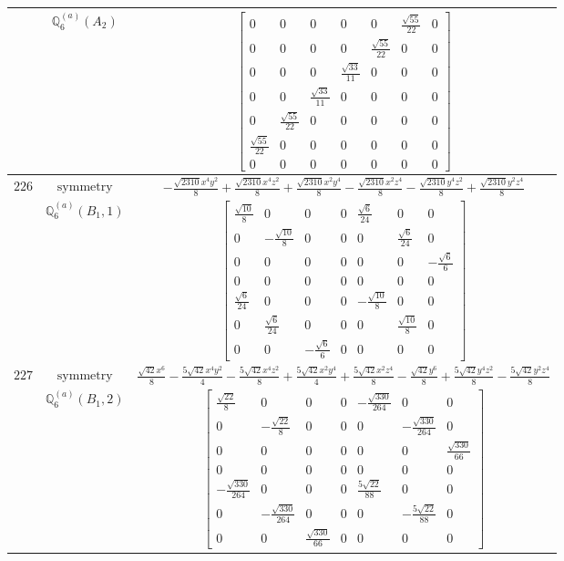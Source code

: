 \documentclass[fleqn,8pt,landscape]{jsarticle}
\begin{document}
\begin{longtable}{ccc}
$  $ & $ \mathbb{Q}_{6}^{(a)}(A_{2}) $ & $ \begin{bmatrix} 0 & 0 & 0 & 0 & 0 & \frac{\sqrt{55}}{22} & 0 \\ 0 & 0 & 0 & 0 & \frac{\sqrt{55}}{22} & 0 & 0 \\ 0 & 0 & 0 & \frac{\sqrt{33}}{11} & 0 & 0 & 0 \\ 0 & 0 & \frac{\sqrt{33}}{11} & 0 & 0 & 0 & 0 \\ 0 & \frac{\sqrt{55}}{22} & 0 & 0 & 0 & 0 & 0 \\ \frac{\sqrt{55}}{22} & 0 & 0 & 0 & 0 & 0 & 0 \\ 0 & 0 & 0 & 0 & 0 & 0 & 0 \end{bmatrix} $ \\ \hline
$ 226 $ & $ \text{symmetry} $ & $ - \frac{\sqrt{2310} x^{4} y^{2}}{8} + \frac{\sqrt{2310} x^{4} z^{2}}{8} + \frac{\sqrt{2310} x^{2} y^{4}}{8} - \frac{\sqrt{2310} x^{2} z^{4}}{8} - \frac{\sqrt{2310} y^{4} z^{2}}{8} + \frac{\sqrt{2310} y^{2} z^{4}}{8} $ \\
$  $ & $ \mathbb{Q}_{6}^{(a)}(B_{1},1) $ & $ \begin{bmatrix} \frac{\sqrt{10}}{8} & 0 & 0 & 0 & \frac{\sqrt{6}}{24} & 0 & 0 \\ 0 & - \frac{\sqrt{10}}{8} & 0 & 0 & 0 & \frac{\sqrt{6}}{24} & 0 \\ 0 & 0 & 0 & 0 & 0 & 0 & - \frac{\sqrt{6}}{6} \\ 0 & 0 & 0 & 0 & 0 & 0 & 0 \\ \frac{\sqrt{6}}{24} & 0 & 0 & 0 & - \frac{\sqrt{10}}{8} & 0 & 0 \\ 0 & \frac{\sqrt{6}}{24} & 0 & 0 & 0 & \frac{\sqrt{10}}{8} & 0 \\ 0 & 0 & - \frac{\sqrt{6}}{6} & 0 & 0 & 0 & 0 \end{bmatrix} $ \\ \hline
$ 227 $ & $ \text{symmetry} $ & $ \frac{\sqrt{42} x^{6}}{8} - \frac{5 \sqrt{42} x^{4} y^{2}}{4} - \frac{5 \sqrt{42} x^{4} z^{2}}{8} + \frac{5 \sqrt{42} x^{2} y^{4}}{4} + \frac{5 \sqrt{42} x^{2} z^{4}}{8} - \frac{\sqrt{42} y^{6}}{8} + \frac{5 \sqrt{42} y^{4} z^{2}}{8} - \frac{5 \sqrt{42} y^{2} z^{4}}{8} $ \\
$  $ & $ \mathbb{Q}_{6}^{(a)}(B_{1},2) $ & $ \begin{bmatrix} \frac{\sqrt{22}}{8} & 0 & 0 & 0 & - \frac{\sqrt{330}}{264} & 0 & 0 \\ 0 & - \frac{\sqrt{22}}{8} & 0 & 0 & 0 & - \frac{\sqrt{330}}{264} & 0 \\ 0 & 0 & 0 & 0 & 0 & 0 & \frac{\sqrt{330}}{66} \\ 0 & 0 & 0 & 0 & 0 & 0 & 0 \\ - \frac{\sqrt{330}}{264} & 0 & 0 & 0 & \frac{5 \sqrt{22}}{88} & 0 & 0 \\ 0 & - \frac{\sqrt{330}}{264} & 0 & 0 & 0 & - \frac{5 \sqrt{22}}{88} & 0 \\ 0 & 0 & \frac{\sqrt{330}}{66} & 0 & 0 & 0 & 0 \end{bmatrix} $ \\ \hline

\end{longtable}
\end{document}
